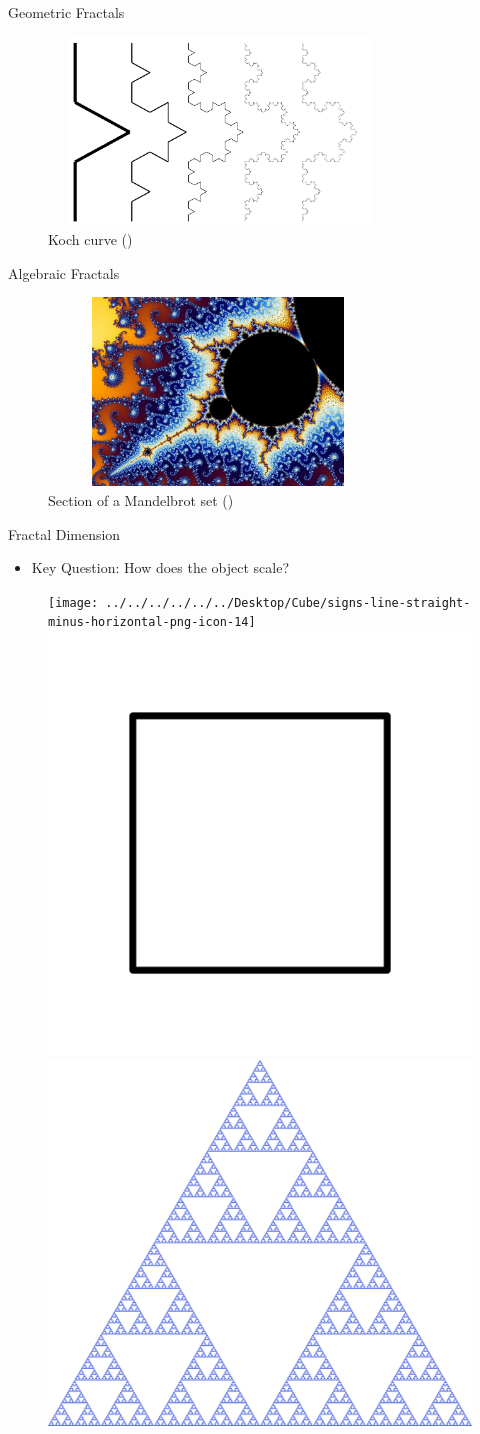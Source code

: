 	\begin{frame}{Geometric Fractals}
		\begin{figure}
		\centering
			\includegraphics[width = 9cm, height = 5cm  ]{images/Koch1.png}
			\caption{Koch curve \space
			(\cite{frac})}
			\label{koch}
		\end{figure}
		\end{frame}
		\begin{frame}{Algebraic Fractals}
		\begin{figure}
			\centering
			\includegraphics[width = 9cm, height = 5cm  ]{images/mandelbrot.jpg}
			\caption{Section of a Mandelbrot set \space
			(\cite{wiki:xxx})}
			\label{mandel}
		\end{figure}
		\end{frame}
		
\begin{frame}{Fractal Dimension}
	\begin{itemize}
		\item Key Question: How does the object scale?
	\end{itemize}
	\begin{figure}
		\centering
		\texttt{[image: ../../../../../../Desktop/Cube/signs-line-straight-minus-horizontal-png-icon-14]}
		\includegraphics[width=0.25\linewidth]{MichaelImages/Square.png}
		\includegraphics[width=0.25\linewidth]{MichaelImages/Sierpinski_triangle.svg.png}
		\caption{\cite{Sierpinski}}
	\end{figure}
\end{frame}

